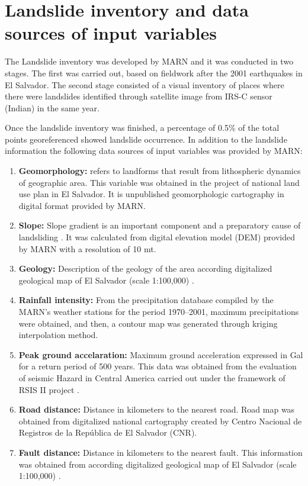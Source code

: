 \documentclass[11pt,twoside]{rmta2010esp}%
\begin{document}
\section{Landslide inventory and data sources of input variables}
\label{sec:landsinvet}
The Landslide inventory was developed by MARN and it was conducted in two stages. The first was carried out, based on fieldwork after the 2001 earthquakes in El Salvador. The second stage consisted of a visual inventory of places where there were landslides identified through satellite image from IRS-C sensor (Indian) in the same year.


Once the landslide inventory was finished, a percentage of 0.5\% of the total points georeferenced showed landslide occurrence. In addition to the landslide information the following data sources of input variables was provided by MARN: 


\begin{enumerate}
\item {\bf Geomorphology:} refers to landforms that result from lithospheric dynamics of geographic area. This variable was obtained in the project of national land use plan in El Salvador. It is unpublished geomorphologic cartography in digital format provided by MARN.


\item {\bf Slope:} Slope gradient is an important component and a
preparatory cause of landsliding \cite{garcia2008}. It was calculated from digital elevation model (DEM) provided by MARN with a resolution of 10 mt. 

\item {\bf Geology:} Description of the geology of the area according digitalized geological map of  El Salvador (scale 1:100,000) \cite{weber}.

\item {\bf Rainfall intensity:} From the precipitation database compiled by the
MARN's weather stations for the period 1970–2001, maximum precipitations were obtained, 
and then, a contour map was generated through kriging interpolation method.

\item {\bf Peak ground accelaration:} Maximum ground acceleration expressed in Gal for a return period of 500 years. This data was obtained from the evaluation of seismic Hazard in Central America carried out under the framework of RSIS II project \cite{beni2012}.

\item {\bf Road distance:} Distance in kilometers to the nearest road. Road map was obtained from digitalized national cartography created by Centro Nacional de Registros de la Rep\'{u}blica de El Salvador (CNR).

\item {\bf Fault distance:} Distance in kilometers to the nearest fault. This information was obtained from according digitalized geological map of El Salvador (scale 1:100,000) \cite{weber}.
 
\end{enumerate}
\end{document}
